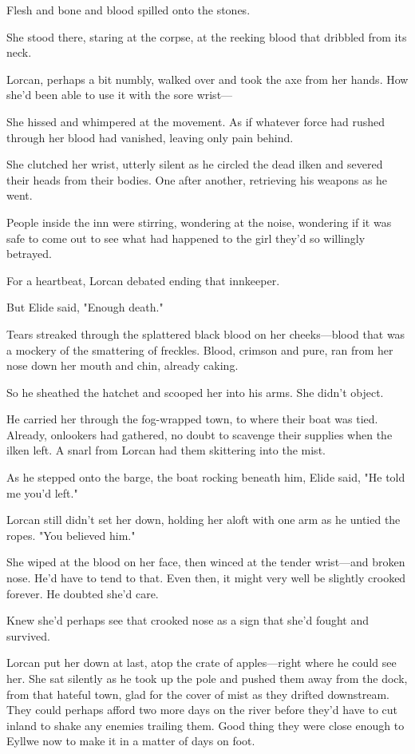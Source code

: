 Flesh and bone and blood spilled onto the stones.

She stood there, staring at the corpse, at the reeking blood that dribbled from its neck.

Lorcan, perhaps a bit numbly, walked over and took the axe from her hands.
How she'd been able to use it with the sore wrist---

She hissed and whimpered at the movement.
As if whatever force had rushed through her blood had vanished, leaving only pain behind.

She clutched her wrist, utterly silent as he circled the dead ilken and severed their heads from their bodies.
One after another, retrieving his weapons as he went.

People inside the inn were stirring, wondering at the noise, wondering if it was safe to come out to see what had happened to the girl they'd so willingly betrayed.

For a heartbeat, Lorcan debated ending that innkeeper.

But Elide said, "Enough death."

Tears streaked through the splattered black blood on her cheeks---blood that was a mockery of the smattering of freckles.
Blood, crimson and pure, ran from her nose down her mouth and chin, already caking.

So he sheathed the hatchet and scooped her into his arms.
She didn't object.

He carried her through the fog-wrapped town, to where their boat was tied.
Already, onlookers had gathered, no doubt to scavenge their supplies when the ilken left.
A snarl from Lorcan had them skittering into the mist.

As he stepped onto the barge, the boat rocking beneath him, Elide said, "He told me you'd left."

Lorcan still didn't set her down, holding her aloft with one arm as he untied the ropes.
"You believed him."

She wiped at the blood on her face, then winced at the tender wrist---and broken nose.
He'd have to tend to that.
Even then, it might very well be slightly crooked forever.
He doubted she'd care.

Knew she'd perhaps see that crooked nose as a sign that she'd fought and survived.

Lorcan put her down at last, atop the crate of apples---right where he could see her.
She sat silently as he took up the pole and pushed them away from the dock, from that hateful town, glad for the cover of mist as they drifted downstream.
They could perhaps afford two more days on the river before they'd have to cut inland to shake any enemies trailing them.
Good thing they were close enough to Eyllwe now to make it in a matter of days on foot.

